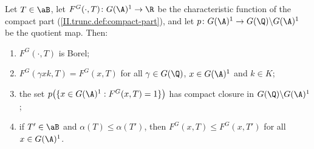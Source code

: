 Let $T\in\aB$, let $F^G(\cdot,T)\colon G(\A)^1\to\R$ be the characteristic function of the compact part (\cref{II.trunc.def:compact-part}),
and let $p\colon G(\A)^1\to G(\Q)\backslash G(\A)^1$ be the quotient map. Then:
\begin{enumerate}
  \item[(a)] $F^G(\cdot,T)$ is Borel;
  \item[(b)] $F^G(\gamma xk,T)=F^G(x,T)$ for all $\gamma\in G(\Q)$, $x\in G(\A)^1$ and $k\in K$;
  \item[(c)] the set $p\bigl(\{x\in G(\A)^1:F^G(x,T)=1\}\bigr)$ has compact closure in $G(\Q)\backslash G(\A)^1$;
  \item[(d)] if $T'\in\aB$ and $\alpha(T)\le\alpha(T')$, then $F^G(x,T)\le F^G(x,T')$ for all $x\in G(\A)^1$.
\end{enumerate}
